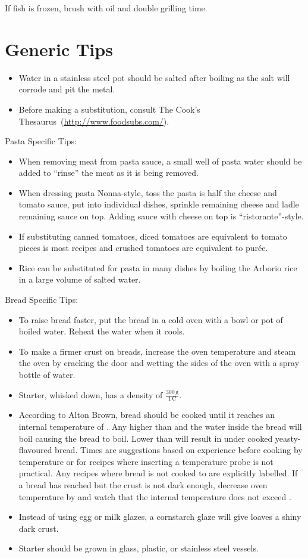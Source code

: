 \documentclass{book}
\begin{document}
If fish is frozen, brush with oil and double grilling time.

\section{Generic Tips}
\begin{itemize}
\item Water in a stainless steel pot should be salted after boiling as the salt will corrode and pit the metal.
\item Before making a substitution, consult The Cook's Thesaurus~(\url{http://www.foodsubs.com/}).
\end{itemize}

\noindent Pasta Specific Tips:
\begin{itemize}
\item When removing meat from pasta sauce, a small well of pasta water should be added to ``rinse'' the meat as it is being removed.
\item When dressing pasta Nonna-style, toss the pasta is half the cheese and tomato sauce, put into individual dishes, sprinkle remaining cheese and ladle remaining sauce on top. Adding sauce with cheese on top is ``ristorante''-style.
\item If substituting canned tomatoes, diced tomatoes are equivalent to tomato pieces is most recipes and crushed tomatoes are equivalent to pur\'ee.
\item Rice can be substituted for pasta in many dishes by boiling the Arborio rice in a large volume of salted water.
\end{itemize}

\noindent Bread Specific Tips:
\begin{itemize}
\item To raise bread faster, put the bread in a cold oven with a bowl or pot of boiled water. Reheat the water when it cools.
\item To make a firmer crust on breads, increase the oven temperature and steam the oven by cracking the door and wetting the sides of the oven with a spray bottle of water.
\item Starter, whisked down, has a density of $\frac{300\,\mathrm{g}}{1\,\mathrm{C}}$.
\item According to Alton Brown, bread should be cooked until it reaches an internal temperature of . Any higher than  and the water inside the bread will boil causing the bread to boil. Lower than  will result in under cooked yeasty-flavoured bread. Times are suggestions based on experience before cooking by temperature or for recipes where inserting a temperature probe is not practical. Any recipes where bread is not cooked to  are explicitly labelled. If a bread has reached  but the crust is not dark enough, decrease oven temperature by  and watch that the internal temperature does not exceed .
\item Instead of using egg or milk glazes, a cornstarch glaze will give loaves a shiny dark crust.
\item Starter should be grown in glass, plastic, or stainless steel vessels.
\end{itemize}
\end{document}
